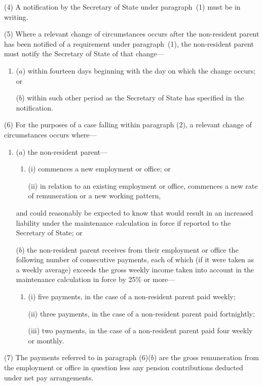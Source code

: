 \documentclass[12pt,a4paper]{article}
\begin{document}
(4) A notification by the Secretary of State under paragraph~(1) must be in writing.

(5) Where a relevant change of circumstances occurs after the non-resident parent has been notified of a requirement under paragraph~(1), the non-resident parent must notify the Secretary of State of that change—
\begin{enumerate}\item[]
($a$) within fourteen days beginning with the day on which the change occurs; or

($b$) within such other period as the Secretary of State has specified in the notification.
\end{enumerate}

(6) For the purposes of a case falling within paragraph (2), a relevant change of circumstances occurs where—
\begin{enumerate}\item[]
($a$) the non-resident parent—
\begin{enumerate}\item[]
(i) commences a new employment or office; or

(ii) in relation to an existing employment or office, commences a new rate of remuneration or a new working pattern,
\end{enumerate}
and could reasonably be expected to know that would result in an increased liability under the maintenance calculation in force if reported to the Secretary of State; or

($b$) the non-resident parent receives from their employment or office the following number of consecutive payments, each of which (if it were taken as a weekly average) exceeds the gross weekly income taken into account in the maintenance calculation in force by 25\% or more—
\begin{enumerate}\item[]
(i) five payments, in the case of a non-resident parent paid weekly;

(ii) three payments, in the case of a non-resident parent paid fortnightly;

(iii) two payments, in the case of a non-resident parent paid four weekly or monthly.
\end{enumerate}
\end{enumerate}

(7) The payments referred to in paragraph (6)($b$)  are the gross remuneration from the employment or office in question less any pension contributions deducted under net pay arrangements.
\end{document}
